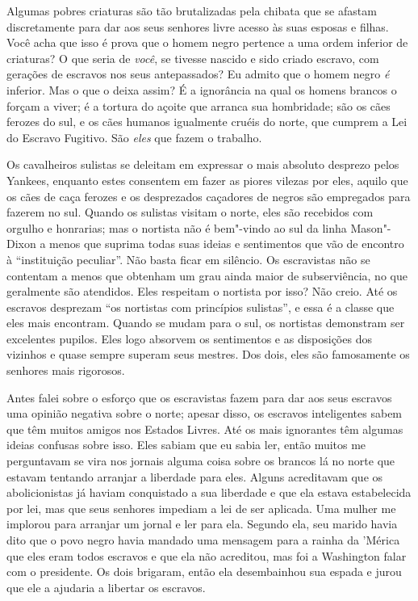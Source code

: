 Algumas pobres criaturas são tão
brutalizadas pela chibata que se afastam discretamente para dar aos seus
senhores livre acesso às suas esposas e filhas. Você acha que isso é
prova que o homem negro pertence a uma ordem inferior de criaturas? O
que seria de \emph{você}, se tivesse nascido e sido criado escravo, com
gerações de escravos nos seus antepassados?
Eu admito que o homem negro
\emph{é} inferior. Mas o que o deixa assim? É a ignorância na qual os
homens brancos o forçam a viver; é a tortura do açoite que arranca sua
hombridade; são os cães ferozes do sul, e os cães humanos igualmente
cruéis do norte, que cumprem a Lei do Escravo Fugitivo. São \emph{eles}
que fazem o trabalho.

Os cavalheiros sulistas se deleitam em
expressar o mais absoluto desprezo pelos Yankees, enquanto estes
consentem em fazer as piores vilezas por eles, aquilo que os cães de
caça ferozes e os desprezados caçadores de negros são empregados para
fazerem no sul. Quando os sulistas visitam o norte, eles são recebidos
com orgulho e honrarias; mas o nortista não é bem"-vindo ao sul da linha
Mason"-Dixon a menos que suprima todas suas ideias e sentimentos que vão
de encontro à ``instituição peculiar''. Não basta ficar em silêncio. Os
escravistas não se contentam a menos que obtenham um grau ainda maior de
subserviência, no que geralmente são atendidos. Eles respeitam o
nortista por isso? Não creio. Até os escravos desprezam ``os nortistas
com princípios sulistas'', e essa é a classe que eles mais encontram.
Quando se mudam para o sul, os nortistas demonstram ser excelentes
pupilos. Eles logo absorvem os sentimentos e as disposições dos vizinhos
e quase sempre superam seus mestres. Dos dois, eles são famosamente os
senhores mais rigorosos.


Antes falei sobre o esforço que os
escravistas fazem para dar aos seus escravos uma opinião negativa sobre
o norte; apesar disso, os escravos inteligentes sabem que têm muitos
amigos nos Estados Livres. Até os mais ignorantes têm algumas ideias
confusas sobre isso. Eles sabiam que eu sabia ler, então muitos me
perguntavam se vira nos jornais alguma coisa sobre os brancos lá no
norte que estavam tentando arranjar a liberdade para eles. Alguns
acreditavam que os abolicionistas já haviam conquistado a sua liberdade
e que ela estava estabelecida por lei, mas que seus senhores impediam a
lei de ser aplicada. Uma mulher me implorou para arranjar um jornal e
ler para ela. Segundo ela, seu marido havia dito que o povo negro havia
mandado uma mensagem para a rainha da 'Mérica que eles eram todos
escravos e que ela não acreditou, mas foi a Washington falar com o
presidente. Os dois brigaram, então ela desembainhou sua espada e jurou
que ele a ajudaria a libertar os escravos.

